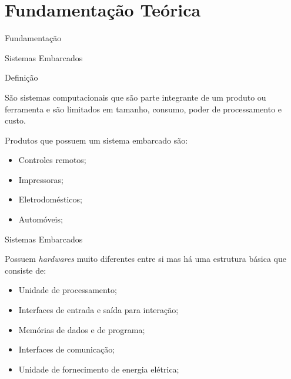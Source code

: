 \section{Fundamentação Teórica}

\begin{frame}
    
    \centering
    \color{blue_theme}\huge{{Fundamentação}}

\end{frame}


\begin{frame}{Sistemas Embarcados}
    \begin{block}{Definição}
        
        São sistemas computacionais que são parte integrante de 
        um produto ou ferramenta e são limitados em tamanho, consumo, 
        poder de processamento e custo. 

        
    \end{block}


    \vspace{30pt}

    Produtos que possuem um sistema embarcado são:

    \begin{itemize}
        \item Controles remotos;
        \item Impressoras;
        \item Eletrodomésticos;
        \item Automóveis;
    \end{itemize}


\end{frame}




\begin{frame}{Sistemas Embarcados}

    Possuem \textit{hardwares} muito diferentes entre si mas há uma estrutura básica que consiste de:
    \begin{itemize}
        \item Unidade de processamento;
        \item Interfaces de entrada e saída para interação;
        \item Memórias de dados e de programa;
        \item Interfaces de comunicação;
        \item Unidade de fornecimento de energia elétrica;
        
    \end{itemize}
\end{frame}



